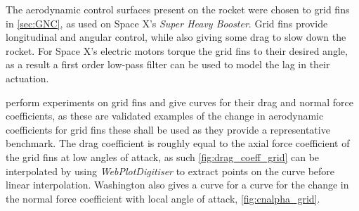The aerodynamic control surfaces present on the rocket were chosen to grid fins in \autoref{sec:GNC}, as used on Space X's \textit{Super Heavy Booster}. Grid fins provide longitudinal and angular control, while also giving some drag to slow down the rocket. For Space X's electric motors torque the grid fins to their desired angle, as a result a first order low-pass filter can be used to model the lag in their actuation.

\cite{washington1993grid} perform experiments on grid fins and give curves for their drag and normal force coefficients, as these are validated examples of the change in aerodynamic coefficients for grid fins these shall be used as they provide a representative benchmark. The drag coefficient is roughly equal to the axial force coefficient of the grid fins at low angles of attack, as such \autoref{fig:drag_coeff_grid} can be interpolated by using \textit{WebPlotDigitiser} to extract points on the curve before linear interpolation. Washington also gives a curve for a curve for the change in the normal force coefficient with local angle of attack, \autoref{fig:cnalpha_grid}.

